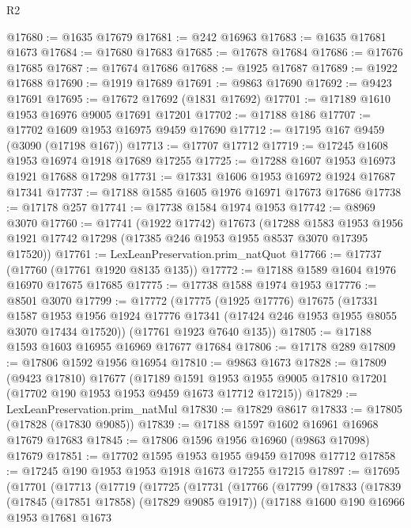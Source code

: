\begin{lexlean}{R2}
\begin{coremodule}
@17680 := @1635 @17679
@17681 := @242 @16963
@17683 := @1635 @17681 @1673
@17684 := @17680 @17683
@17685 := @17678 @17684
@17686 := @17676 @17685
@17687 := @17674 @17686
@17688 := @1925 @17687
@17689 := @1922 @17688
@17690 := @1919 @17689
@17691 := @9863 @17690
@17692 := @9423 @17691
@17695 := @17672 @17692 (@1831 @17692)
@17701 := @17189 @1610 @1953 @16976 @9005 @17691 @17201
@17702 := @17188 @186
@17707 := @17702 @1609 @1953 @16975 @9459 @17690
@17712 := @17195 @167 @9459 (@3090 (@17198 @167))
@17713 := @17707 @17712
@17719 := @17245 @1608 @1953 @16974 @1918 @17689 @17255
@17725 := @17288 @1607 @1953 @16973 @1921 @17688 @17298
@17731 := @17331 @1606 @1953 @16972 @1924 @17687 @17341
@17737 := @17188 @1585 @1605 @1976 @16971 @17673 @17686
@17738 := @17178 @257
@17741 := @17738 @1584 @1974 @1953
@17742 := @8969 @3070
@17760 := @17741
    (@1922 @17742)
    @17673
    (@17288
      @1583
      @1953
      @1956
      @1921
      @17742
      @17298
      (@17385 @246 @1953 @1955 @8537 @3070 @17395 @17520))
@17761 := LexLeanPreservation.prim_natQuot
@17766 := @17737 (@17760 (@17761 @1920 @8135 @135))
@17772 := @17188 @1589 @1604 @1976 @16970 @17675 @17685
@17775 := @17738 @1588 @1974 @1953
@17776 := @8501 @3070
@17799 := @17772
    (@17775
      (@1925 @17776)
      @17675
      (@17331
        @1587
        @1953
        @1956
        @1924
        @17776
        @17341
        (@17424 @246 @1953 @1955 @8055 @3070 @17434 @17520))
      (@17761 @1923 @7640 @135))
@17805 := @17188 @1593 @1603 @16955 @16969 @17677 @17684
@17806 := @17178 @289
@17809 := @17806 @1592 @1956 @16954
@17810 := @9863 @1673
@17828 := @17809
    (@9423 @17810)
    @17677
    (@17189
      @1591
      @1953
      @1955
      @9005
      @17810
      @17201
      (@17702 @190 @1953 @1953 @9459 @1673 @17712 @17215))
@17829 := LexLeanPreservation.prim_natMul
@17830 := @17829 @8617
@17833 := @17805 (@17828 (@17830 @9085))
@17839 := @17188 @1597 @1602 @16961 @16968 @17679 @17683
@17845 := @17806 @1596 @1956 @16960 (@9863 @17098) @17679
@17851 := @17702 @1595 @1953 @1955 @9459 @17098 @17712
@17858 := @17245 @190 @1953 @1953 @1918 @1673 @17255 @17215
@17897 := @17695
    (@17701
      (@17713
        (@17719
          (@17725
            (@17731
              (@17766
                (@17799
                  (@17833
                    (@17839
                      (@17845 (@17851 @17858) (@17829 @9085 @1917))
                      (@17188
                        @1600
                        @190
                        @16966
                        @1953
                        @17681
                        @1673

\end{coremodule}
\end{lexlean}
